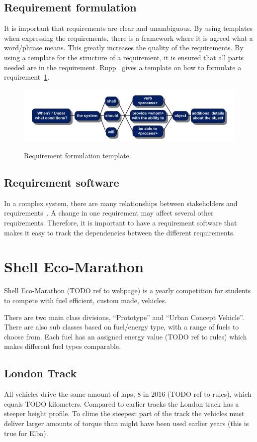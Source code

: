 \subsection{Requirement formulation}
It is important that requirements are clear and unambiguous. By using templates
when expressing the requirements, there is a framework where it is agreed what a
word/phrase means. This greatly increases the quality of the requirements\cite{rupp2014}. 
By using a template for the structure of a requirement, it is
ensured that all parts needed are in the requirement. Rupp~\cite{rupp2014}
gives a template on how to formulate a requirement~\ref{fig:req_template}.
\begin{figure}[H]
    \centering
    \includegraphics[width=\textwidth]{./img/introduction_req_template.PNG}\label{fig:req_template}
    \caption{Requirement formulation template.}
\end{figure}
\subsection{Requirement software}
In a complex system, there are many relationships between stakeholders and
requirements~\cite{ibm_req}. A change in one requirement may affect several other
requirements. Therefore, it is important to have a requirement software that
makes it easy to track the dependencies between the different requirements.

\section{Shell Eco-Marathon}
Shell Eco-Marathon (TODO ref to webpage) is a yearly competition for students to compete with fuel efficient, custom made, vehicles.

There are two main class divisions, ``Prototype'' and ``Urban Concept
Vehicle''. There are also sub classes based on fuel/energy type, with a range
of fuels to choose from. Each fuel has an assigned energy value (TODO ref to
rules) which makes different fuel types comparable. 

\subsection{London Track}
All vehicles drive the same amount of laps, 8 in 2016 (TODO ref to rules), which equals TODO kilometers. Compared to earlier tracks the London track has a steeper height profile. To clime the steepest part of the track the vehicles must deliver larger amounts of torque than might have been used earlier years (this is true for Elba). 

